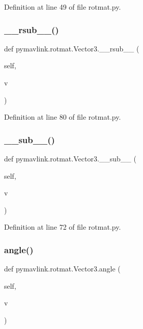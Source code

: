 Definition at line 49 of file rotmat.\+py.

\mbox{\label{classpymavlink_1_1rotmat_1_1Vector3_afee5ea0e352d8883870289c7a3ff4c00}} 
\subsubsection{\texorpdfstring{\_\_rsub\_\_()}{\_\_rsub\_\_()}}
{\footnotesize\ttfamily def pymavlink.\+rotmat.\+Vector3.\+\_\+\+\_\+rsub\+\_\+\+\_\+ (\begin{DoxyParamCaption}\item[{}]{self,  }\item[{}]{v }\end{DoxyParamCaption})}



Definition at line 80 of file rotmat.\+py.

\mbox{\label{classpymavlink_1_1rotmat_1_1Vector3_ae99e68a5082cc1251ee12bcc198e331b}} 
\subsubsection{\texorpdfstring{\_\_sub\_\_()}{\_\_sub\_\_()}}
{\footnotesize\ttfamily def pymavlink.\+rotmat.\+Vector3.\+\_\+\+\_\+sub\+\_\+\+\_\+ (\begin{DoxyParamCaption}\item[{}]{self,  }\item[{}]{v }\end{DoxyParamCaption})}



Definition at line 72 of file rotmat.\+py.

\mbox{\label{classpymavlink_1_1rotmat_1_1Vector3_a6f26e26f6bbc45630fe618da692f5148}} 
\subsubsection{\texorpdfstring{angle()}{angle()}}
{\footnotesize\ttfamily def pymavlink.\+rotmat.\+Vector3.\+angle (\begin{DoxyParamCaption}\item[{}]{self,  }\item[{}]{v }\end{DoxyParamCaption})}

